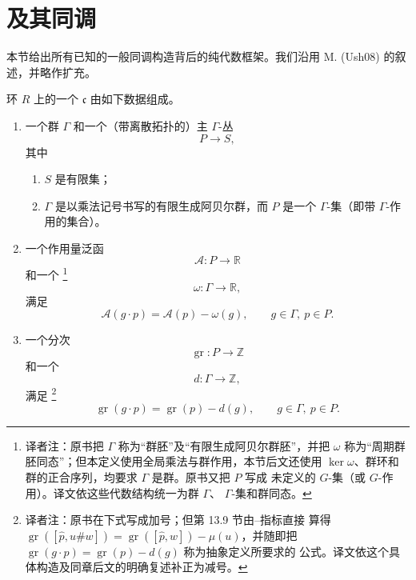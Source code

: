 \section{\termAbstractFloerComplex{}及其同调}
\label{sec:abstract-floer-complex-homology}

本节给出所有已知的一般\personFloer{}同调构造背后的纯代数框架。我们沿用
M. \personUsher{} (Ush08) 的叙述，并略作扩充。

\begin{definition}
\label{def:graded-filtered-floer-novikov-complex}
环 $R$ 上的一个\termGradedFilteredFloerNovikovComplex{} $\mathfrak c$ 由如下数据组成。
\begin{enumerate}[label=(\arabic*)]
  \item 一个群 $\Gamma$ 和一个（带离散拓扑的）主 $\Gamma$-丛
  \[
    P\longrightarrow S,
  \]
  其中
  \begin{enumerate}[label=(\alph*)]
    \item $S$ 是有限集；
    \item $\Gamma$ 是以乘法记号书写的有限生成阿贝尔群，而 $P$ 是一个
    $\Gamma$-集（即带 $\Gamma$-作用的集合）。
  \end{enumerate}
  \item 一个作用量泛函
  \[
    \mathcal A:P\longrightarrow\mathbb R
  \]
  和一个\termPeriodHomomorphism{}
  \footnote{译者注：原书把 $\Gamma$ 称为“群胚”及“有限生成阿贝尔群胚”，并把
  $\omega$ 称为“周期群胚同态”；但本定义使用全局乘法与群作用，本节后文还使用
  $\ker\omega$、群环和群的正合序列，均要求 $\Gamma$ 是群。原书又把 $P$ 写成
  未定义的 $G$-集（或 $G$-作用）。译文依这些代数结构统一为群 $\Gamma$、
  $\Gamma$-集和群同态。}
  \[
    \omega:\Gamma\longrightarrow\mathbb R,
  \]
  满足
  \[
    \mathcal A(g\cdot p)=\mathcal A(p)-\omega(g),
    \qquad g\in\Gamma,\ p\in P.
  \]

  \item 一个分次
  \[
    \operatorname{gr}:P\longrightarrow\mathbb Z
  \]
  和一个\termDegreeHomomorphism{}
  \[
    d:\Gamma\longrightarrow\mathbb Z,
  \]
  满足
  \footnote{译者注：原书在下式写成加号；但第 13.9 节由\personMaslov{}--\personMorse{}指标直接
  算得 $\operatorname{gr}([\widehat p,u\#w])
  =\operatorname{gr}([\widehat p,w])-\mu(u)$，并随即把
  $\operatorname{gr}(g\cdot p)=\operatorname{gr}(p)-d(g)$ 称为抽象定义所要求的
  公式。译文依这个具体构造及同章后文的明确复述补正为减号。}
  \[
    \operatorname{gr}(g\cdot p)
    =\operatorname{gr}(p)-d(g),
    \qquad g\in\Gamma,\ p\in P.
  \]


\end{enumerate}
\end{definition}
